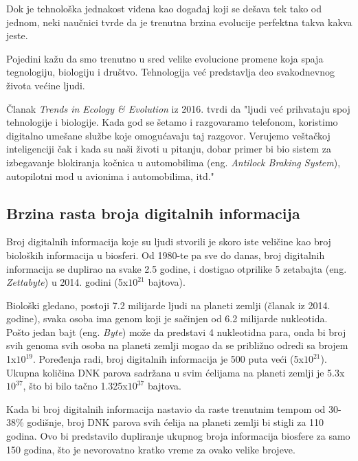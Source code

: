 \documentclass[a4paper]{article}
\begin{document}
Dok je tehnološka jednakost viđena kao događaj koji se dešava tek tako od jednom, neki naučnici tvrde da je trenutna brzina evolucije perfektna takva kakva jeste.

Pojedini kažu da smo trenutno u sred velike evolucione promene koja spaja tegnologiju, biologiju i društvo. Tehnologija već predstavlja deo svakodnevnog života većine ljudi.

Članak \textit{Trends in Ecology \& Evolution}\cite{r3} iz 2016. tvrdi da "ljudi već prihvataju spoj tehnologije i biologije. Kada god se šetamo i razgovaramo telefonom, koristimo digitalno umešane službe koje omogućavaju taj razgovor. Verujemo veštačkoj inteligenciji čak i kada su naši životi u pitanju, dobar primer bi bio sistem za izbegavanje blokiranja kočnica u automobilima (eng. \textit{Antilock Braking System}), autopilotni mod u avionima i automobilima, itd."

\subsection{Brzina rasta broja digitalnih informacija}
\label{subsec:broj_digitalnih_informacija_}

\hfill

Broj digitalnih informacija koje su ljudi stvorili je skoro iste veličine kao broj bioloških informacija u biosferi. Od 1980-te pa sve do danas, broj digitalnih informacija se duplirao na svake 2.5 godine, i dostigao otprilike 5 zetabajta (eng. \textit{Zettabyte}) u 2014. godini (5x$10^{21}$ bajtova).

Biološki gledano, postoji 7.2 milijarde ljudi na planeti zemlji (članak iz 2014. godine), svaka osoba ima genom koji je sačinjen od 6.2 milijarde nukleotida. Pošto jedan bajt (eng. \textit{Byte}) može da predstavi 4 nukleotidna para, onda bi broj svih genoma svih osoba na planeti zemlji mogao da se približno odredi sa brojem 1x$10^{19}$. Poređenja radi, broj digitalnih informacija je 500 puta veći (5x$10^{21}$). Ukupna količina DNK parova sadržana u svim ćelijama na planeti zemlji je 5.3x$10^{37}$, što bi bilo tačno 1.325x$10^{37}$ bajtova.

Kada bi broj digitalnih informacija nastavio da raste trenutnim tempom od 30-38\% godišnje, broj DNK parova svih ćelija na planeti zemlji bi stigli za 110 godina. Ovo bi predstavilo dupliranje ukupnog broja informacija biosfere za samo 150 godina, što je nevorovatno kratko vreme za ovako velike brojeve.\cite{r6}
\end{document}
